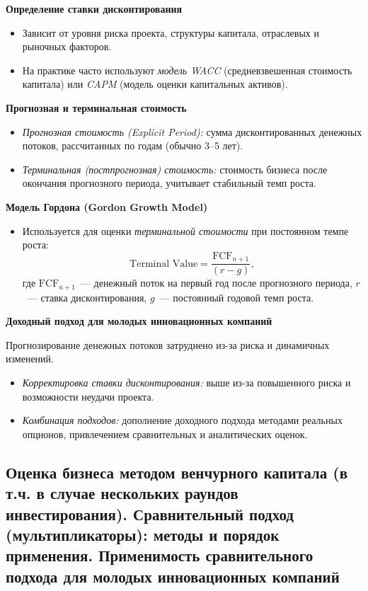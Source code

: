 \textbf{Определение ставки дисконтирования}
\begin{itemize}
    \item Зависит от уровня риска проекта, структуры капитала, отраслевых и рыночных факторов.
    \item На практике часто используют \textit{модель WACC} (средневзвешенная стоимость капитала) или \textit{CAPM} (модель оценки капитальных активов).
\end{itemize}

\textbf{Прогнозная и терминальная стоимость}
\begin{itemize}
    \item \textit{Прогнозная стоимость (Explícit Period):} сумма дисконтированных денежных потоков, рассчитанных по годам (обычно 3--5 лет).
    \item \textit{Терминальная (постпрогнозная) стоимость:} стоимость бизнеса после окончания прогнозного периода, учитывает стабильный темп роста.
\end{itemize}

\textbf{Модель Гордона (Gordon Growth Model)}
\begin{itemize}
    \item Используется для оценки \textit{терминальной стоимости} при постоянном темпе роста:
    \begin{equation}
        \text{Terminal Value} = \frac{\text{FCF}_{n+1}}{(r - g)},
    \end{equation}
    где $\text{FCF}_{n+1}$~--- денежный поток на первый год после прогнозного периода, $r$~--- ставка дисконтирования, $g$~--- постоянный годовой темп роста.
\end{itemize}

\textbf{Доходный подход для молодых инновационных компаний}

Прогнозирование денежных потоков затруднено из-за риска и динамичных изменений.
\begin{itemize}
    \item \textit{Корректировка ставки дисконтирования:} выше из-за повышенного риска и возможности неудачи проекта.
    \item \textit{Комбинация подходов:} дополнение доходного подхода методами реальных опционов, привлечением сравнительных и аналитических оценок.
\end{itemize}
\pagebreak

\subsection{Оценка бизнеса методом венчурного капитала (в т.ч. в случае нескольких раундов инвестирования). Сравнительный подход (мультипликаторы): методы и порядок применения. Применимость сравнительного подхода для молодых инновационных компаний}

